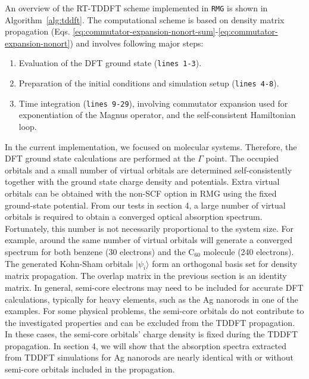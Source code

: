 \documentclass[journal=jctcce,manuscript=article,etalmode=truncate,maxauthors=10,layout=twocolumn,9pt]{achemso}   %
\begin{document}
An overview of the RT-TDDFT scheme   implemented  in \texttt{RMG} is shown in Algorithm~\ref{alg:tddft}.
The computational  scheme is based on  density matrix propagation 
(Eqs. \ref{eq:commutator-expansion-nonort-sum}-\ref{eq:commutator-expansion-nonort})  
and  involves following major steps:
\begin{enumerate}
\item Evaluation  of  the DFT ground state   (\texttt{lines 1-3}).
\item  Preparation of the initial conditions  and simulation  setup (\texttt{lines 4-8}).
\item  Time integration (\texttt{lines 9-29}), involving
       commutator   expansion used for  exponentiation of  the Magnus   operator, and   
       the self-consistent Hamiltonian loop.
\end{enumerate}

In the current implementation, we focused on molecular systems. Therefore, 
the DFT ground state calculations are performed at  the $\Gamma$ point. The occupied orbitals and a small number of virtual orbitals are determined self-consistently together with the ground state charge density and potentials. Extra virtual orbitals can be obtained with the non-SCF option in RMG using the fixed ground-state potential. From our tests in section 4, a large number of virtual orbitals is required to obtain a converged optical absorption spectrum. Fortunately, this number is not necessarily proportional to the system size. For example, around the same number of virtual orbitals will generate a converged spectrum for both benzene (30 electrons) and the C$_{60}$ molecule (240 electrons). 
The generated Kohn-Sham orbitals $|\psi_i\rangle$  form an orthogonal basis set for density matrix propagation. The overlap matrix in the previous section is an identity matrix.  
In general, semi-core electrons may need to be included for accurate DFT calculations, typically for heavy elements, such as the Ag nanorods in one of the examples. For some physical problems, the semi-core orbitals do not contribute to the investigated properties and can be excluded from the TDDFT propagation. In these cases, the semi-core orbitals' charge density is fixed during the TDDFT propagation. In section 4, we will show that the absorption spectra extracted from TDDFT simulations for Ag nanorods are nearly identical with or without semi-core orbitals included in the propagation.   
\end{document}
